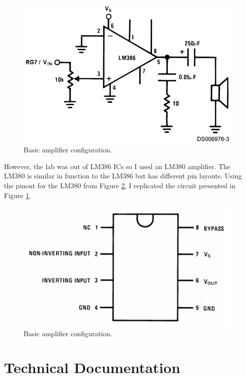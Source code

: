 \documentclass[11pt]{article}
\begin{document}
\begin{figure}[h!]
\centering
\includegraphics[scale=0.7]{amp.png}
\caption{Basic amplifier configuration.}
\label{fig:amp_sch}
\end{figure} 
 
However, the lab was out of LM386 ICs so I used an LM380 amplifier. The LM380 is similar in function to the LM386 but has different pin layouts. Using the pinout for the LM380 from Figure \ref{fig:LM380_pin}, I replicated the circuit presented in Figure \ref{fig:amp_sch}. \\
 
\begin{figure}[h!]
\centering
\includegraphics[scale=0.8]{LM380_pin.png}
\caption{Basic amplifier configuration.}
\label{fig:LM380_pin}
\end{figure} 


\clearpage


\section{Technical Documentation}
\end{document}
